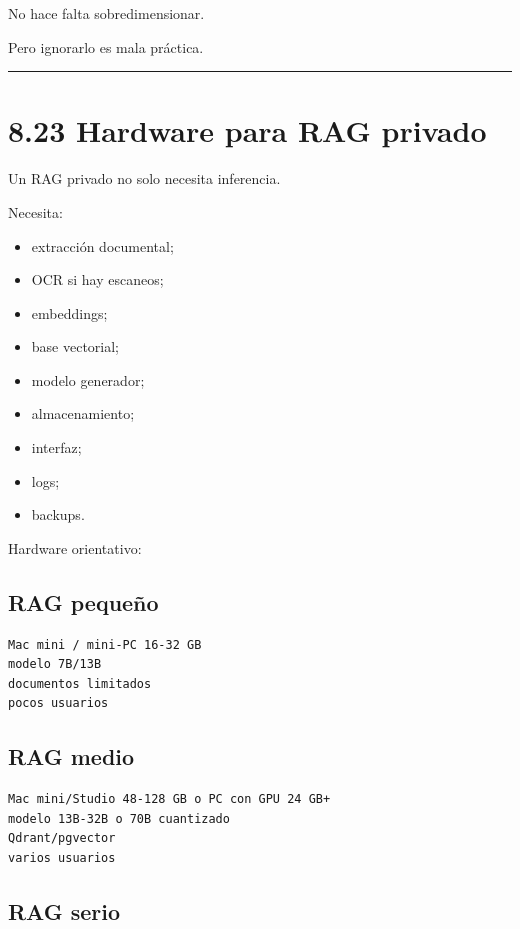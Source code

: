No hace falta sobredimensionar.

Pero ignorarlo es mala práctica.

\begin{center}\rule{0.5\linewidth}{0.5pt}\end{center}

\section{8.23 Hardware para RAG
privado}\label{hardware-para-rag-privado}

Un RAG privado no solo necesita inferencia.

Necesita:

\begin{itemize}
\tightlist
\item
  extracción documental;
\item
  OCR si hay escaneos;
\item
  embeddings;
\item
  base vectorial;
\item
  modelo generador;
\item
  almacenamiento;
\item
  interfaz;
\item
  logs;
\item
  backups.
\end{itemize}

Hardware orientativo:

\subsection{RAG pequeño}\label{rag-pequeuxf1o}

\begin{lstlisting}
Mac mini / mini-PC 16-32 GB
modelo 7B/13B
documentos limitados
pocos usuarios
\end{lstlisting}

\subsection{RAG medio}\label{rag-medio}

\begin{lstlisting}
Mac mini/Studio 48-128 GB o PC con GPU 24 GB+
modelo 13B-32B o 70B cuantizado
Qdrant/pgvector
varios usuarios
\end{lstlisting}

\subsection{RAG serio}\label{rag-serio}


